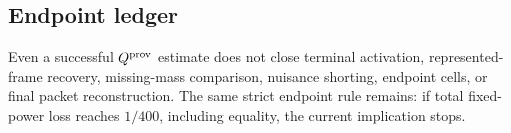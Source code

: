 \subsection{Endpoint ledger}

Even a successful \(Q^{\rm prov}\) estimate does not close terminal
activation, represented-frame recovery, missing-mass comparison,
nuisance shorting, endpoint cells, or final packet reconstruction.  The
same strict endpoint rule remains: if total fixed-power loss reaches
\(1/400\), including equality, the current implication stops.
